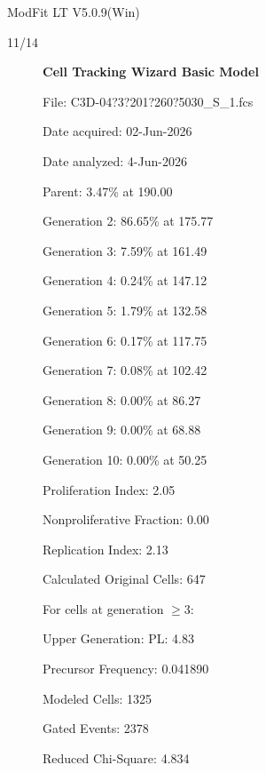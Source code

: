 \documentclass[UTF8,10pt,a4paper,fontset=fandol]{ctexart}
\newcommand{\handwritten}[1]{#1}
\begin{document}
\vfill

\noindent\scriptsize ModFit LT V5.0.9(Win)

\hfill
\handwritten{11/14}

\newpage

\begin{figure}[ht]
\centering
\hfill
\begin{minipage}[t]{0.48\linewidth}
\small
\textbf{Cell Tracking Wizard Basic Model}

File: C3D-04?3?201?260?5030\_S\_1.fcs

Date acquired: 02-Jun-2026

Date analyzed: 4-Jun-2026

\medskip
Parent: 3.47\% at 190.00

Generation 2: 86.65\% at 175.77

Generation 3: 7.59\% at 161.49

Generation 4: 0.24\% at 147.12

Generation 5: 1.79\% at 132.58

Generation 6: 0.17\% at 117.75

Generation 7: 0.08\% at 102.42

Generation 8: 0.00\% at 86.27

Generation 9: 0.00\% at 68.88

Generation 10: 0.00\% at 50.25

\medskip
Proliferation Index: 2.05

Nonproliferative Fraction: 0.00

Replication Index: 2.13

Calculated Original Cells: 647

\medskip
For cells at generation $\geq 3$:

Upper Generation: PL: 4.83

Precursor Frequency: 0.041890

Modeled Cells: 1325

Gated Events: 2378

Reduced Chi-Square: 4.834
\end{minipage}
\end{figure}
\end{document}
